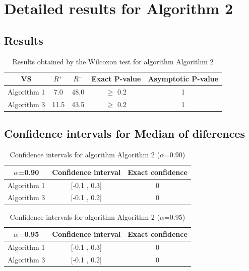 \documentclass[a4paper,10pt]{article}
\begin{document}
 \clearpage 


\section{Detailed results for Algorithm 2}


\subsection{Results}

\begin{table}[!htp]
\centering\small
\begin{tabular}{
|c|c|c|c|c|}
\hline
 VS & $R^{+}$ & $R^{-}$ & Exact P-value & Asymptotic P-value \\ \hline 
Algorithm 1 & 7.0 & 48.0 & $\geq$ 0.2 & 1\\ \hline 
Algorithm 3 & 11.5 & 43.5 & $\geq$ 0.2 & 1\\ \hline 

\end{tabular}
\caption{Results obtained by the Wilcoxon test for algorithm Algorithm 2}
\end{table}

\subsection{Confidence intervals for Median of diferences}

\begin{table}[!htp]
\centering\small
\begin{tabular}{
|c|c|c|}
\hline
 $\alpha$=0.90 & Confidence interval & Exact confidence \\ \hline 
Algorithm 1 & [-0.1 , 0.3] & 0\\ \hline 
Algorithm 3 & [-0.1 , 0.2] & 0\\ \hline 

\end{tabular}
\caption{Confidence intervals for algorithm Algorithm 2 ($\alpha$=0.90)}
\end{table}
\begin{table}[!htp]
\centering\small
\begin{tabular}{
|c|c|c|}
\hline
 $\alpha$=0.95 & Confidence interval & Exact confidence \\ \hline 
Algorithm 1 & [-0.1 , 0.3] & 0\\ \hline 
Algorithm 3 & [-0.1 , 0.2] & 0\\ \hline 

\end{tabular}
\caption{Confidence intervals for algorithm Algorithm 2 ($\alpha$=0.95)}
\end{table}
\end{document}
